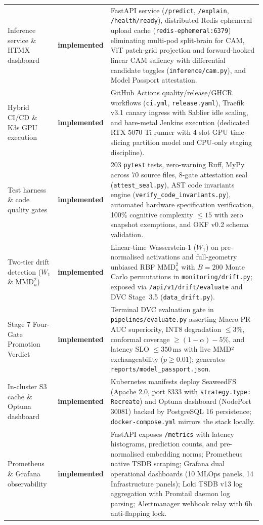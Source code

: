 \begin{longtable}{@{}p{} p{} p{}@{}}
\addlinespace
Inference service \& HTMX dashboard & \textbf{implemented} & FastAPI service (\texttt{/predict}, \texttt{/explain}, \texttt{/health/ready}), distributed Redis ephemeral upload cache (\texttt{redis-ephemeral:6379}) eliminating multi-pod split-brain for CAM, ViT patch-grid projection and forward-hooked linear CAM saliency with differential candidate toggles (\texttt{inference/cam.py}), and Model Passport attestation. \\
\addlinespace
Hybrid CI/CD \& K3s GPU execution & \textbf{implemented} & GitHub Actions quality/release/GHCR workflows (\texttt{ci.yml}, \texttt{release.yaml}), Traefik v3.1 canary ingress with Sablier idle scaling, and bare-metal Jenkins execution (dedicated RTX 5070 Ti runner with 4-slot GPU time-slicing partition model and CPU-only staging discipline). \\
\addlinespace
Test harness \& code quality gates & \textbf{implemented} & 203 \texttt{pytest} tests, zero-warning Ruff, MyPy across 70 source files, 8-gate attestation seal (\nolinkurl{attest_seal.py}), AST code invariants engine (\nolinkurl{verify_code_invariants.py}), automated hardware specification verification, 100\% cognitive complexity $\le 15$ with zero snapshot exemptions, and OKF v0.2 schema validation. \\
\addlinespace
Two-tier drift detection ($W_1$ \& $\text{MMD}_u^2$) & \textbf{implemented} & Linear-time Wasserstein-1 ($W_1$) on pre-normalised activations and full-geometry unbiased RBF $\text{MMD}_u^2$ with $B=200$ Monte Carlo permutations in \texttt{monitoring/drift.py}; exposed via \nolinkurl{/api/v1/drift/evaluate} and DVC Stage~3.5 (\texttt{data\_drift.py}). \\
\addlinespace
Stage 7 Four-Gate Promotion Verdict & \textbf{implemented} & Terminal DVC evaluation gate in \texttt{pipelines/evaluate.py} asserting Macro PR-AUC superiority, INT8 degradation $\le 3\%$, conformal coverage $\ge (1-\alpha)-5\%$, and latency SLO $\le 350\,\text{ms}$ with live MMD² exchangeability ($p \ge 0.01$); generates \nolinkurl{reports/model_passport.json}. \\
\addlinespace
In-cluster S3 cache \& Optuna dashboard & \textbf{implemented} & Kubernetes manifests deploy SeaweedFS (Apache 2.0, port 8333 with \texttt{strategy.type: Recreate}) and Optuna dashboard (NodePort 30081) backed by PostgreSQL 16 persistence; \texttt{docker-compose.yml} mirrors the stack locally. \\
\addlinespace
Prometheus \& Grafana observability & \textbf{implemented} & FastAPI exposes \texttt{/metrics} with latency histograms, prediction counts, and pre-normalised embedding norms; Prometheus native TSDB scraping; Grafana dual operational dashboards (10 MLOps panels, 14 Infrastructure panels); Loki TSDB v13 log aggregation with Promtail daemon log parsing; Alertmanager webhook relay with 6h anti-flapping lock. \\

\end{longtable}
